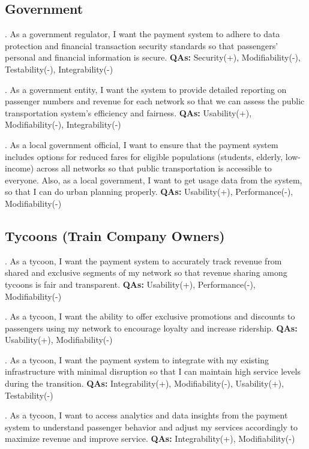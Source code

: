 \subsection{Government}

. As a government regulator, I want the payment system to adhere to data protection and financial transaction security standards so that passengers' personal and financial information is secure. \textbf{QAs:} Security(+), Modifiability(-), Testability(-), Integrability(-)

. As a government entity, I want the system to provide detailed reporting on passenger numbers and revenue for each network so that we can assess the public transportation system's efficiency and fairness. \textbf{QAs:} Usability(+), Modifiability(-), Integrability(-)

. As a local government official, I want to ensure that the payment system includes options for reduced fares for eligible populations (students, elderly, low-income) across all networks so that public transportation is accessible to everyone. Also, as a local government, I want to get usage data from the system, so that I can do urban planning properly. \textbf{QAs:} Usability(+), Performance(-), Modifiability(-)

\subsection{Tycoons (Train Company Owners)}

. As a tycoon, I want the payment system to accurately track revenue from shared and exclusive segments of my network so that revenue sharing among tycoons is fair and transparent. \textbf{QAs:} Usability(+), Performance(-), Modifiability(-)

. As a tycoon, I want the ability to offer exclusive promotions and discounts to passengers using my network to encourage loyalty and increase ridership. \textbf{QAs:} Usability(+), Modifiability(-)

. As a tycoon, I want the payment system to integrate with my existing infrastructure with minimal disruption so that I can maintain high service levels during the transition. \textbf{QAs:} Integrability(+), Modifiability(-), Usability(+), Testability(-)

. As a tycoon, I want to access analytics and data insights from the payment system to understand passenger behavior and adjust my services accordingly to maximize revenue and improve service. \textbf{QAs:} Integrability(+), Modifiability(-)

